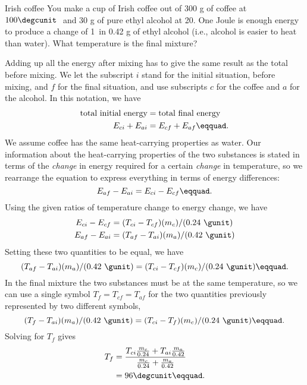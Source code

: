 \begin{eg}{Irish coffee}
\egquestion You make a cup of Irish coffee out of 300 g of
coffee at $100\degcunit\ $ and 30 g of pure ethyl alcohol at
20\degcunit. One Joule is enough energy to produce a change of
1\degcunit\ in 0.42 g of ethyl alcohol (i.e., alcohol is easier
to heat than water). What temperature is the final mixture?

\eganswer Adding up all the energy after mixing has to give
the same result as the total before mixing. We let the
subscript $i$ stand for the initial situation, before
mixing, and $f$ for the final situation, and use subscripts
$c$ for the coffee and $a$ for the alcohol. In this notation, we have
\begin{align*}
 \text{total initial energy} &= \text{total final energy} \\
 E_{ci}+E_{ai} &= E_{cf}+E_{af}\eqquad.
\end{align*}
We assume coffee has the same heat-carrying properties as
water. Our information about the heat-carrying properties of
the two substances is stated in terms of the \emph{change} in
energy required for a certain \emph{change} in temperature, so we
rearrange the equation to express everything in terms
of energy differences:
\begin{equation*}
                E_{af}-E_{ai} =    E_{ci}-E_{cf}\eqquad.
\end{equation*}
Using the given ratios of temperature change to energy change, we have
\begin{align*}
 E_{ci}-E_{cf} &= (T_{ci}-T_{cf})(m_c)/(0.24\ \gunit) \\
 E_{af}-E_{ai} &= (T_{af}-T_{ai})(m_a)/(0.42\ \gunit)
\end{align*}
Setting these two quantities to be equal, we have
\begin{equation*}
        (T_{af}-T_{ai})(m_a)/(0.42\ \gunit)         =      (T_{ci}-T_{cf})(m_c)/(0.24\ \gunit)\eqquad.
\end{equation*}
In the final mixture the two substances must be at the same
temperature, so we can use a single symbol $T_f=T_{cf}=T_{af}$
for the two quantities previously represented by two different symbols,
\begin{equation*}
                (T_f-T_{ai})(m_a)/(0.42\ \gunit)         =      (T_{ci}-T_f)(m_c)/(0.24\ \gunit)\eqquad.
\end{equation*}
Solving for $T_f$ gives
\begin{align*}
 T_f &= \frac{T_{ci}\frac{m_c}{0.24}+T_{ai}\frac{m_a}{0.42}}{\frac{m_c}{0.24}+\frac{m_a}{0.42}}\\
 &= 96\degcunit\eqquad.
\end{align*}
\end{eg}

